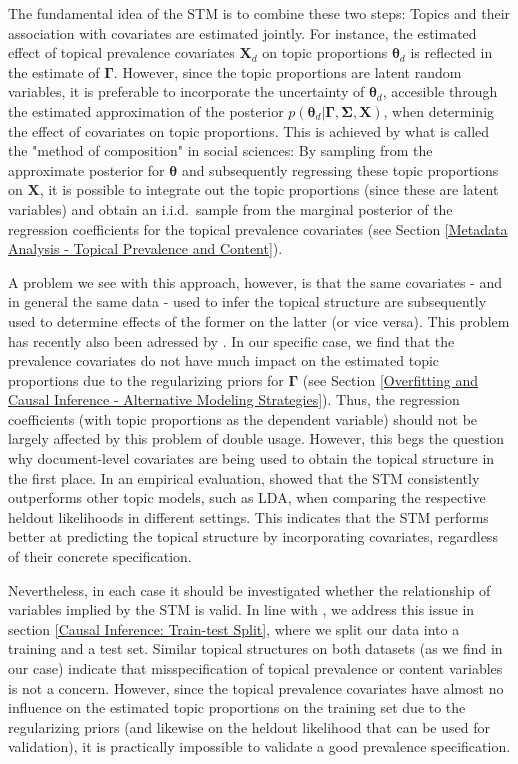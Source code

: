 The fundamental idea of the STM is to combine these two steps: Topics and their association with covariates are estimated jointly. For instance, the estimated effect of topical prevalence covariates $\boldsymbol{X}_d$ on topic proportions $\boldsymbol{\theta}_d$ is reflected in the estimate of $\boldsymbol{\Gamma}$. However, since the topic proportions are latent random variables, it is preferable to incorporate the uncertainty of $\boldsymbol{\theta}_d$, accesible through the estimated approximation of the posterior $p(\boldsymbol{\theta}_d | \boldsymbol{\Gamma}, \boldsymbol{\Sigma}, \boldsymbol{X})$, when determinig the effect of covariates on topic proportions. This is achieved by what is called the "method of composition" in social sciences: By sampling from the approximate posterior for $\boldsymbol{\theta}$ and subsequently regressing these topic proportions on $\boldsymbol{X}$, it is possible to integrate out the topic proportions (since these are latent variables) and obtain an i.i.d.\ sample from the marginal posterior of the regression coefficients for the topical prevalence covariates (see Section \ref{Metadata Analysis - Topical Prevalence and Content}).

A problem we see with this approach, however, is that the same covariates - and in general the same data - used to infer the topical structure are subsequently used to determine effects of the former on the latter (or vice versa). This problem has recently also been adressed by \cite{egami2018make}. In our specific case, we find that the prevalence covariates do not have much impact on the estimated topic proportions due to the regularizing priors for $\boldsymbol{\Gamma}$ (see Section \ref{Overfitting and Causal Inference - Alternative Modeling Strategies}). Thus, the regression coefficients (with topic proportions as the dependent variable) should not be largely affected by this problem of double usage. However, this begs the question why document-level covariates are being used to obtain the topical structure in the first place. In an empirical evaluation, \cite{roberts2016model} showed that the STM consistently outperforms other topic models, such as LDA, when comparing the respective heldout likelihoods in different settings. This indicates that the STM performs better at predicting the topical structure by incorporating covariates, regardless of their concrete specification.

Nevertheless, in each case it should be investigated whether the relationship of variables implied by the STM is valid. In line with \cite{egami2018make}, we address this issue in section \ref{Causal Inference: Train-test Split}, where we split our data into a training and a test set. Similar topical structures on both datasets (as we find in our case) indicate that misspecification of topical prevalence or content variables is not a concern. However, since the topical prevalence covariates have almost no influence on the estimated topic proportions on the training set due to the regularizing priors (and likewise on the heldout likelihood that can be used for validation), it is practically impossible to validate a good prevalence specification.

